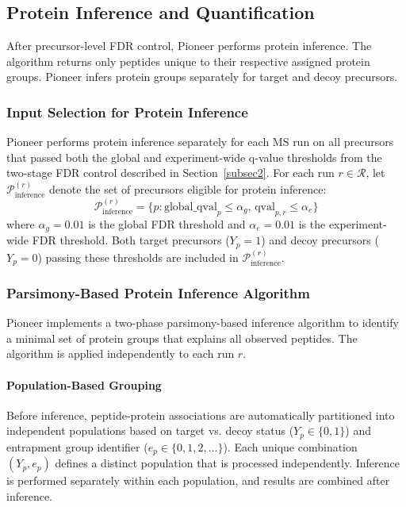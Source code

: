 \documentclass[pdflatex,sn-nature]{sn-jnl}
\begin{document}

\subsection{Protein Inference and Quantification}\label{subsec:protein_inference}

After precursor-level FDR control, Pioneer performs protein inference. The algorithm returns only peptides unique to their respective assigned protein groups. Pioneer infers protein groups separately for target and decoy precursors.

\subsubsection{Input Selection for Protein Inference}\label{subsubsec:input-selection-protein-inference}

Pioneer performs protein inference separately for each MS run on all precursors that passed both the global and experiment-wide q-value thresholds from the two-stage FDR control described in Section~\ref{subsec2}. For each run $r \in \mathcal{R}$, let $\mathcal{P}_{\text{inference}}^{(r)}$ denote the set of precursors eligible for protein inference:
\begin{equation}
\mathcal{P}_{\text{inference}}^{(r)} = \{p : \text{global\_qval}_p \leq \alpha_g, \, \text{qval}_{p,r} \leq \alpha_e\}
\end{equation}
where $\alpha_g = 0.01$ is the global FDR threshold and $\alpha_e = 0.01$ is the experiment-wide FDR threshold. Both target precursors ($Y_p = 1$) and decoy precursors ($Y_p = 0$) passing these thresholds are included in $\mathcal{P}_{\text{inference}}^{(r)}$.

\subsubsection{Parsimony-Based Protein Inference Algorithm}\label{subsubsec:parsimony-based-protein-inference}

Pioneer implements a two-phase parsimony-based inference algorithm \cite{Nesvizhskii2005,Zhang2007} to identify a minimal set of protein groups that explains all observed peptides. The algorithm is applied independently to each run $r$.

\paragraph{Population-Based Grouping}\label{para:population-based-grouping} Before inference, peptide-protein associations are automatically partitioned into independent populations based on target vs. decoy status ($Y_p \in \{0,1\}$) and entrapment group identifier ($e_p \in \{0, 1, 2, \ldots\}$). Each unique combination $(Y_p, e_p)$ defines a distinct population that is processed independently. Inference is performed separately within each population, and results are combined after inference.
\end{document}
